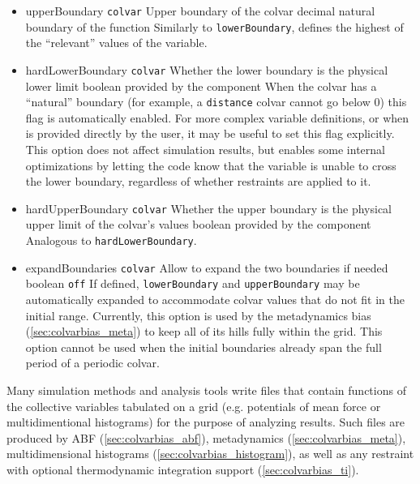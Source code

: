 \begin{itemize}
\item %
  \keydef
    {upperBoundary}{%
    \texttt{colvar}}{%
    Upper boundary of the colvar}{%
    decimal}{%
    natural boundary of the function}{%
    Similarly to \texttt{lowerBoundary}, defines the highest of the ``relevant'' values of the variable.}

\item %
  \keydef
    {hardLowerBoundary}{%
    \texttt{colvar}}{%
    Whether the lower boundary is the physical lower limit}{%
    boolean}{%
    provided by the component}{%
    When the colvar has a ``natural'' boundary (for example, a \texttt{distance} colvar cannot go below 0) this flag is automatically enabled.
    For more complex variable definitions, or when  is provided directly by the user, it may be useful to set this flag explicitly.
    This option does not affect simulation results, but enables some internal optimizations by letting the code know that the variable is unable to cross the lower boundary, regardless of whether restraints are applied to it.
}

\item %
  \keydef
    {hardUpperBoundary}{%
    \texttt{colvar}}{%
    Whether the upper boundary is the physical upper limit of the colvar's values}{%
    boolean}{%
    provided by the component}{%
    Analogous to \texttt{hardLowerBoundary}.}

\item %
  \keydef
    {expandBoundaries}{%
    \texttt{colvar}}{%
    Allow to expand the two boundaries if needed}{%
    boolean}{%
    \texttt{off}}{%
    If defined, \texttt{lowerBoundary} and \texttt{upperBoundary} may be automatically expanded to accommodate colvar values that do not fit in the initial range.
    Currently, this option is used by the metadynamics bias
    (\ref{sec:colvarbias_meta}) to keep all of its hills fully within
    the grid.  This option cannot be used when
      the initial boundaries already span the full period of a periodic
      colvar.}

\end{itemize}



Many simulation methods and analysis tools write files that contain functions of the collective variables tabulated on a grid (e.g.{} potentials of mean force or multidimentional histograms) for the purpose of analyzing results.
Such files are produced by ABF (\ref{sec:colvarbias_abf}), metadynamics (\ref{sec:colvarbias_meta}), multidimensional histograms (\ref{sec:colvarbias_histogram}), as well as any restraint with optional thermodynamic integration support (\ref{sec:colvarbias_ti}).

